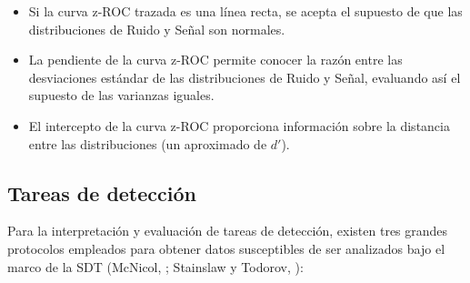 \begin{itemize}
\item Si la curva z-ROC trazada es una línea recta, se acepta el supuesto de que las distribuciones de Ruido y Señal son normales.\\
\item La pendiente de la curva z-ROC permite conocer la razón entre las desviaciones estándar de las distribuciones de Ruido y Señal, evaluando así el supuesto de las varianzas iguales.\\
\item El intercepto de la curva z-ROC proporciona información sobre la distancia entre las distribuciones (un aproximado de $d'$).\\
\end{itemize}



\subsection{Tareas de detección}

Para la interpretación y evaluación de tareas de detección, existen tres grandes protocolos empleados para obtener datos susceptibles de ser analizados bajo el marco de la SDT (McNicol, \citeyear{McNicol2}; Stainslaw y Todorov, \citeyear{Stainslaw1999}):\\


